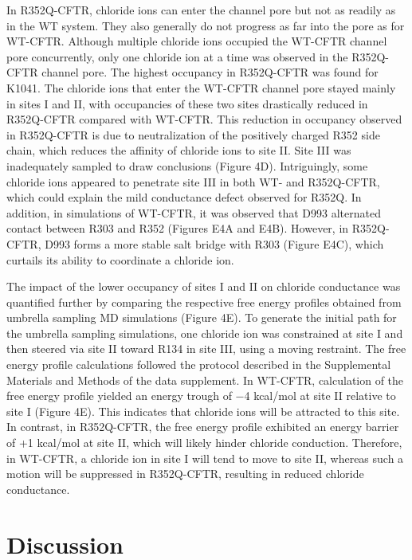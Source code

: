 In R352Q-CFTR, chloride ions can enter the channel pore but not as readily as in the WT system. They also generally do not progress as far into the pore as for WT-CFTR. Although multiple chloride ions occupied the WT-CFTR channel pore concurrently, only one chloride ion at a time was observed in the R352Q-CFTR channel pore. The highest occupancy in R352Q-CFTR was found for K1041. The chloride ions that enter the WT-CFTR channel pore stayed mainly in sites I and II, with occupancies of these two sites drastically reduced in R352Q-CFTR compared with WT-CFTR. This reduction in occupancy observed in R352Q-CFTR is due to neutralization of the positively charged R352 side chain, which reduces the affinity of chloride ions to site II. Site III was inadequately sampled to draw conclusions (Figure 4D). Intriguingly, some chloride ions appeared to penetrate site III in both WT- and R352Q-CFTR, which could explain the mild conductance defect observed for R352Q. In addition, in simulations of WT-CFTR, it was observed that D993 alternated contact between R303 and R352 (Figures E4A and E4B). However, in R352Q-CFTR, D993 forms a more stable salt bridge with R303 (Figure E4C), which curtails its ability to coordinate a chloride ion.

The impact of the lower occupancy of sites I and II on chloride conductance was quantified further by comparing the respective free energy profiles obtained from umbrella sampling MD simulations (Figure 4E). To generate the initial path for the umbrella sampling simulations, one chloride ion was constrained at site I and then steered via site II toward R134 in site III, using a moving restraint. The free energy profile calculations followed the protocol described in the Supplemental Materials and Methods of the data supplement. In WT-CFTR, calculation of the free energy profile yielded an energy trough of −4 kcal/mol at site II relative to site I (Figure 4E). This indicates that chloride ions will be attracted to this site. In contrast, in R352Q-CFTR, the free energy profile exhibited an energy barrier of +1 kcal/mol at site II, which will likely hinder chloride conduction. Therefore, in WT-CFTR, a chloride ion in site I will tend to move to site II, whereas such a motion will be suppressed in R352Q-CFTR, resulting in reduced chloride conductance.

\section{Discussion}
